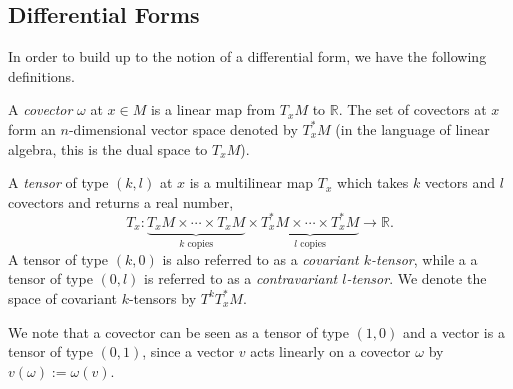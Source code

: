 \subsection{Differential Forms}
In order to build up to the notion of a differential form, we have the following definitions.
\begin{definition}
A \textit{covector} $\omega$ at $x\in M$ is a linear map from $T_xM$ to $\mathbb{R}$. The set of covectors at $x$ form an $n$-dimensional vector space denoted by $T^*_xM$ (in the language of linear algebra, this is the dual space to $T_xM$).
\end{definition}
\begin{definition}
A \textit{tensor} of type $(k,l)$ at $x$ is a multilinear map $T_x$ which takes $k$ vectors and $l$ covectors and returns a real number,
\[
T_x:\underbrace{T_xM\times\cdots\times T_xM}_{k\text{ copies}}\times\underbrace{T^*_xM\times\cdots\times T^*_xM}_{l\text{ copies}}\to\mathbb{R}.
\]
A tensor of type $(k,0)$ is also referred to as a \textit{covariant $k$-tensor}, while a a tensor of type $(0,l)$ is referred to as a \textit{contravariant $l$-tensor}. We denote the space of covariant $k$-tensors by $T^kT^*_xM$.
\end{definition}
We note that a covector can be seen as a tensor of type $(1,0)$ and a vector is a tensor of type $(0,1)$, since a vector $v$ acts linearly on a covector $\omega$ by $v(\omega):=\omega(v)$.\\


